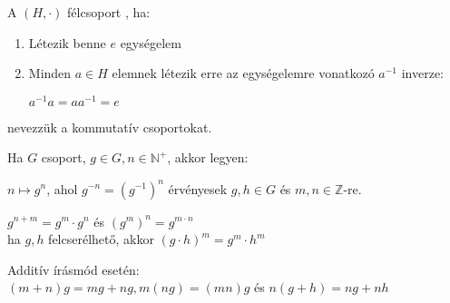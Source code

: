 \begin{frame}
  \begin{tcolorbox}[title={Def.: Csoport, Abel-csoport}]
    A $(H, {\cdot})$ félcsoport , ha:
    \begin{enumerate}
      \item Létezik benne $e$ egységelem
      \item Minden $a \in H$ elemnek létezik erre az egységelemre vonatkozó $a^{-1}$ inverze:\\
      \msmallskip
      
      $a^{-1}a = aa^{-1} = e$
    \end{enumerate}
    \mmedskip

     nevezzük a kommutatív csoportokat.
  \end{tcolorbox}

  \begin{tcolorbox}[title={Def.: $n$ tényezős szorzat / Hatványozás egész kitevővel}]
    Ha $G$ csoport, $g \in G, n \in \mathbb{N}^+$, akkor legyen:\\
    \msmallskip
    
    $n \mapsto g^n$, ahol $g^{-n} = (g^{-1})^n$ érvényesek $g, h \in G$ és $m, n \in \mathbb{Z}$-re.\\
    \msmallskip

    $g^{n + m} = g^m \cdot g^n$ és $(g^m)^n = g^{m \cdot n}$\\
    ha $g, h$ felcserélhető, akkor $(g \cdot h)^m = g^m \cdot h^m$\\
    \msmallskip

    Additív írásmód esetén:\\
    $(m + n)g = mg + ng, m(ng) = (mn)g$ és $n(g + h) = ng + nh$
  \end{tcolorbox}
\end{frame}


